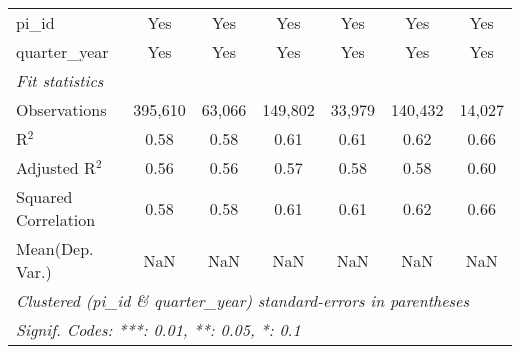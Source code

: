 \begin{tabular}{lcccccc}
   pi\_id                                                     & Yes           & Yes           & Yes           & Yes           & Yes           & Yes\\  
   quarter\_year                                              & Yes           & Yes           & Yes           & Yes           & Yes           & Yes\\  
   \midrule
   \emph{Fit statistics}\\
   Observations                                               & 395,610       & 63,066        & 149,802       & 33,979        & 140,432       & 14,027\\  
   R$^2$                                                      & 0.58          & 0.58          & 0.61          & 0.61          & 0.62          & 0.66\\  
   Adjusted R$^2$                                             & 0.56          & 0.56          & 0.57          & 0.58          & 0.58          & 0.60\\  
   Squared Correlation                                        & 0.58          & 0.58          & 0.61          & 0.61          & 0.62          & 0.66\\  
Mean(Dep. Var.) & NaN & NaN & NaN & NaN & NaN & NaN \\
   \midrule \midrule
   \multicolumn{7}{l}{\emph{Clustered (pi\_id \& quarter\_year) standard-errors in parentheses}}\\
   \multicolumn{7}{l}{\emph{Signif. Codes: ***: 0.01, **: 0.05, *: 0.1}}\\
\end{tabular}
\par\endgroup
